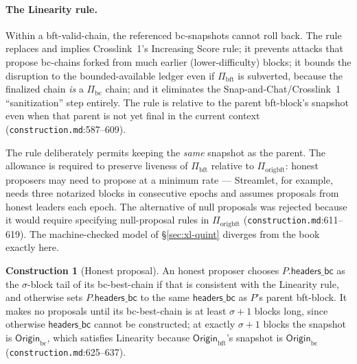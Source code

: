 \documentclass[11pt,a4paper]{article}
\theoremstyle{definition}
\newtheorem{construction}[theorem]{Construction}
\begin{document}
\paragraph{The Linearity rule.} Within a bft-valid-chain, the referenced
bc-snapshots cannot roll back. The rule replaces and implies Crosslink~1's
Increasing Score rule; it prevents attacks that propose bc-chains forked
from much earlier (lower-difficulty) blocks; it bounds the disruption to
the bounded-available ledger even if $\Pi_{\mathrm{bft}}$ is subverted,
because the finalized chain \emph{is} a $\Pi_{\mathrm{bc}}$ chain; and it
eliminates the Snap-and-Chat/Crosslink~1 ``sanitization'' step entirely.
The rule is relative to the parent bft-block's snapshot even when that
parent is not yet final in the current context
(\texttt{construction.md}:587--609).

The rule deliberately permits keeping the \emph{same} snapshot as the
parent. The allowance is required to preserve liveness of
$\Pi_{\mathrm{bft}}$ relative to $\Pi_{\mathrm{origbft}}$: honest
proposers may need to propose at a minimum rate --- Streamlet, for
example, needs three notarized blocks in consecutive epochs and assumes
proposals from honest leaders each epoch. The alternative of null
proposals was rejected because it would require specifying null-proposal
rules in $\Pi_{\mathrm{origbft}}$ (\texttt{construction.md}:611--619).
The machine-checked model of \S\ref{sec:xl-quint} diverges from the book
exactly here.

\begin{construction}[Honest proposal]\label{def:xl-honest-proposal}
An honest proposer chooses $P.\mathsf{headers\_bc}$ as the $\sigma$-block
tail of its bc-best-chain if that is consistent with the Linearity rule,
and otherwise sets $P.\mathsf{headers\_bc}$ to the same
$\mathsf{headers\_bc}$ as $P$'s parent bft-block. It makes no proposals
until its bc-best-chain is at least $\sigma + 1$ blocks long, since
otherwise $\mathsf{headers\_bc}$ cannot be constructed; at exactly $\sigma
+ 1$ blocks the snapshot is $\mathsf{Origin}_{\mathrm{bc}}$, which
satisfies Linearity because $\mathsf{Origin}_{\mathrm{bft}}$'s snapshot is
$\mathsf{Origin}_{\mathrm{bc}}$ (\texttt{construction.md}:625--637).
\end{construction}
\end{document}
